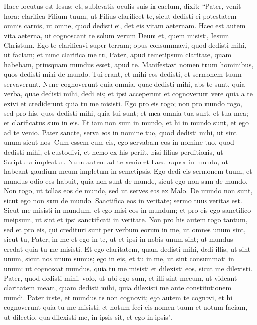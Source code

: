\begin{biblechapter} 
\verse Haec locutus est Iesus; et, sublevatis oculis suis in caelum, dixit: “Pater, venit hora: clarifica Filium tuum, ut Filius clarificet te, 
\verse sicut dedisti ei potestatem omnis carnis, ut omne, quod dedisti ei, det eis vitam aeternam. 
\verse Haec est autem vita aeterna, ut cognoscant te solum verum Deum et, quem misisti, Iesum Christum. 
\verse Ego te clarificavi super terram; opus consummavi, quod dedisti mihi, ut faciam; 
\verse et nunc clarifica me tu, Pater, apud temetipsum claritate, quam habebam, priusquam mundus esset, apud te. 
\verse Manifestavi nomen tuum hominibus, quos dedisti mihi de mundo. Tui erant, et mihi eos dedisti, et sermonem tuum servaverunt. 
\verse Nunc cognoverunt quia omnia, quae dedisti mihi, abs te sunt, 
\verse quia verba, quae dedisti mihi, dedi eis; et ipsi acceperunt et cognoverunt vere quia a te exivi et crediderunt quia tu me misisti. 
\verse Ego pro eis rogo; non pro mundo rogo, sed pro his, quos dedisti mihi, quia tui sunt; 
\verse et mea omnia tua sunt, et tua mea; et clarificatus sum in eis. 
\verse Et iam non sum in mundo, et hi in mundo sunt, et ego ad te venio. Pater sancte, serva eos in nomine tuo, quod dedisti mihi, ut sint unum sicut nos. 
\verse Cum essem cum eis, ego servabam eos in nomine tuo, quod dedisti mihi, et custodivi, et nemo ex his periit, nisi filius perditionis, ut Scriptura impleatur. 
\verse Nunc autem ad te venio et haec loquor in mundo, ut habeant gaudium meum impletum in semetipsis. 
\verse Ego dedi eis sermonem tuum, et mundus odio eos habuit, quia non sunt de mundo, sicut ego non sum de mundo. 
\verse Non rogo, ut tollas eos de mundo, sed ut serves eos ex Malo. 
\verse De mundo non sunt, sicut ego non sum de mundo. 
\verse Sanctifica eos in veritate; sermo tuus veritas est. 
\verse Sicut me misisti in mundum, et ego misi eos in mundum;  
\verse et pro eis ego sanctifico meipsum, ut sint et ipsi sanctificati in veritate. 
\verse Non pro his autem rogo tantum, sed et pro eis, qui credituri sunt per verbum eorum in me, 
\verse ut omnes unum sint, sicut tu, Pater, in me et ego in te, ut et ipsi in nobis unum sint; ut mundus credat quia tu me misisti. 
\verse Et ego claritatem, quam dedisti mihi, dedi illis, ut sint unum, sicut nos unum sumus; 
\verse ego in eis, et tu in me, ut sint consummati in unum; ut cognoscat mundus, quia tu me misisti et dilexisti eos, sicut me dilexisti. 
\verse Pater, quod dedisti mihi, volo, ut ubi ego sum, et illi sint mecum, ut videant claritatem meam, quam dedisti mihi, quia dilexisti me ante constitutionem mundi. 
\verse Pater iuste, et mundus te non cognovit; ego autem te cognovi, et hi cognoverunt quia tu me misisti; 
\verse et notum feci eis nomen tuum et notum faciam, ut dilectio, qua dilexisti me, in ipsis sit, et ego in ipsis". 
\end{biblechapter}

